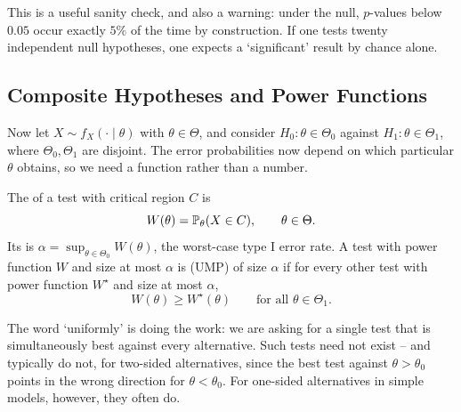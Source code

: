 \documentclass[a4paper]{scrartcl}
\begin{document}
This is a useful sanity check, and also a warning: under the null, $p$-values below $0.05$ occur exactly $5\%$ of the time by construction. If one tests twenty independent null hypotheses, one expects a `significant' result by chance alone.

\subsection{Composite Hypotheses and Power Functions}

Now let $X \sim f_X(\cdot\mid\theta)$ with $\theta \in \Theta$, and consider $H_0 : \theta \in \Theta_0$ against $H_1 : \theta \in \Theta_1$, where $\Theta_0, \Theta_1$ are disjoint. The error probabilities now depend on which particular $\theta$ obtains, so we need a function rather than a number.

\begin{definition}
  The  of a test with critical region $C$ is
  $$
  W(\theta) = \mathbb{P}_\theta(X \in C), \qquad \theta \in \Theta.
  $$
  Its  is $\alpha = \sup_{\theta\in\Theta_0}W(\theta)$, the worst-case type I error rate. A test with power function $W$ and size at most $\alpha$ is  (UMP) of size $\alpha$ if for every other test with power function $W^\star$ and size at most $\alpha$,
  $$
  W(\theta) \geq W^\star(\theta) \qquad \text{for all } \theta \in \Theta_1.
  $$
\end{definition}

The word `uniformly' is doing the work: we are asking for a single test that is simultaneously best against every alternative. Such tests need not exist -- and typically do not, for two-sided alternatives, since the best test against $\theta > \theta_0$ points in the wrong direction for $\theta < \theta_0$. For one-sided alternatives in simple models, however, they often do.
\end{document}
